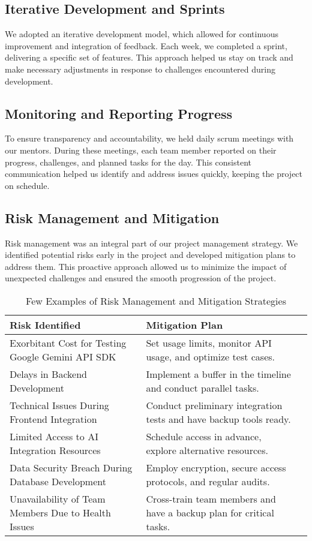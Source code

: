 \subsection{Iterative Development and Sprints}
We adopted an iterative development model, which allowed for continuous improvement and integration of feedback. Each week, we completed a sprint, delivering a specific set of features. This approach helped us stay on track and make necessary adjustments in response to challenges encountered during development.

\subsection{Monitoring and Reporting Progress}
To ensure transparency and accountability, we held daily scrum meetings with our mentors. During these meetings, each team member reported on their progress, challenges, and planned tasks for the day. This consistent communication helped us identify and address issues quickly, keeping the project on schedule.

\subsection{Risk Management and Mitigation}
Risk management was an integral part of our project management strategy. We identified potential risks early in the project and developed mitigation plans to address them. This proactive approach allowed us to minimize the impact of unexpected challenges and ensured the smooth progression of the project.

\begin{table}[h!]
\centering
\begin{tabular}{|l|l|l|}
\hline
\textbf{Risk Identified}                             & \textbf{Mitigation Plan}                                                \\ \hline
Exorbitant Cost for Testing Google Gemini API SDK    & Set usage limits, monitor API usage, and optimize test cases.           \\ \hline
Delays in Backend Development                        & Implement a buffer in the timeline and conduct parallel tasks.          \\ \hline
Technical Issues During Frontend Integration         & Conduct preliminary integration tests and have backup tools ready.      \\ \hline
Limited Access to AI Integration Resources           & Schedule access in advance, explore alternative resources.              \\ \hline
Data Security Breach During Database Development     & Employ encryption, secure access protocols, and regular audits.         \\ \hline
Unavailability of Team Members Due to Health Issues  & Cross-train team members and have a backup plan for critical tasks.     \\ \hline
\end{tabular}
\caption{Few Examples of Risk Management and Mitigation Strategies}
\end{table}
